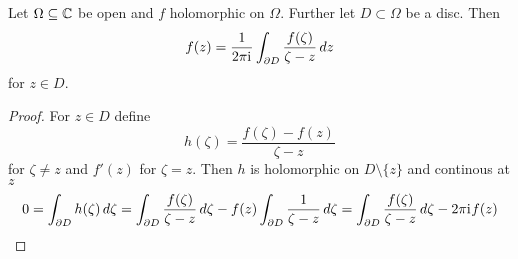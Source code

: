 \begin{theorem}
	Let \( \Omega \subseteq \mathbb{C} \) be open and \( f \) holomorphic on \( \Omega \). Further let \( D \subset \Omega \)
	be a disc. Then
	\[
		f(z) = \frac{1}{2\pi\iu} \int_{\boundary D} \frac{f(\zeta)}{\zeta - z}\,dz%
	\]
	for \( z \in D \).
\end{theorem}

\begin{proof}
	For \( z \in D \) define
	\[
		h(\zeta) = \frac{f(\zeta)- f(z)}{\zeta - z} %
	\]
	for \( \zeta \ne z \) and \( f'(z)  \) for \( \zeta = z \). Then \( h \) is holomorphic on \( D \setminus \{ z \} \) and
	continous at \( z \)
	\[
		0 = \int_{\partial D} h(\zeta) \,d\zeta
		= \int_{\partial D} \frac{f(\zeta)}{\zeta - z}\,d\zeta - f(z)\int_{\partial D} \frac{1}{\zeta - z}\,d\zeta
		= \int_{\partial D} \frac{f(\zeta)}{\zeta - z}\,d\zeta - 2\pi\mathrm{i}\mkern1mu f(z)
	\]
\end{proof}
\bigskip
